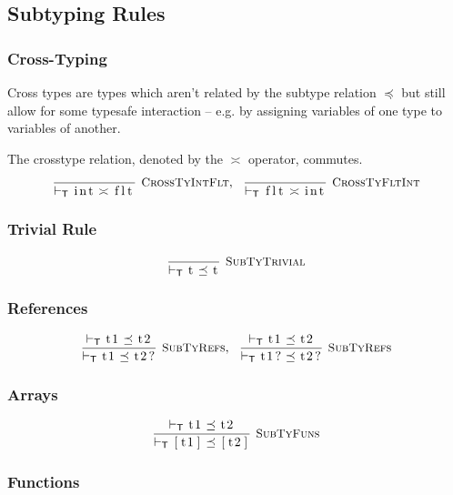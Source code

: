\documentclass{article}
\newcommand{\code}[1]{\lstinline[columns=fixed]{#1}}
\newcommand{\drmrule}[5]{\frac{#1}{#2\vdash_{\mathsf{#3}}#4}\textsc{\ \small{#5}}}
\newcommand{\ruleapp}[1]{\vdash_{\mathsf{#1}}}
\newcommand{\mc}[1]{\textnormal{\code{#1}}}
\begin{document}
		\subsection{Subtyping Rules}
		
			\subsubsection{Cross-Typing}
			
				Cross types are types which aren't related by the subtype relation $\preceq$ but still allow for some typesafe interaction -- e.g. by assigning variables of one type to variables of another.
				
				The crosstype relation, denoted by the $\asymp$ operator, commutes.
				\begin{align*}
					\drmrule{}{}{T}{\mc{int} \asymp \mc{flt}}{CrossTyIntFlt},\ \ 
					\drmrule{}{}{T}{\mc{flt} \asymp \mc{int}}{CrossTyFltInt}
				\end{align*}
		
			\subsubsection{Trivial Rule}
			
				\begin{align*}
					\drmrule{}{}{T}{\mc{t} \preceq \mc{t}}{SubTyTrivial}
				\end{align*}
				
			\subsubsection{References}
			
				\begin{align*}
					\drmrule{\ruleapp{T}\mc{t1} \preceq \mc{t2}}{}{T}{\mc{t1} \preceq \mc{t2?}}{SubTyRefs},\ \ 
					\drmrule{\ruleapp{T}\mc{t1}\preceq\mc{t2}}{}{T}{\mc{t1?} \preceq \mc{t2?}}{SubTyRefs}
				\end{align*}
				
			\subsubsection{Arrays}
			
				\begin{align*}
					\drmrule{\ruleapp{T}\mc{t1}\preceq\mc{t2}}{}{T}{\mc{[t1]}\preceq\mc{[t2]}}{SubTyFuns}
				\end{align*}
		
			\subsubsection{Functions}
			
\end{document}
